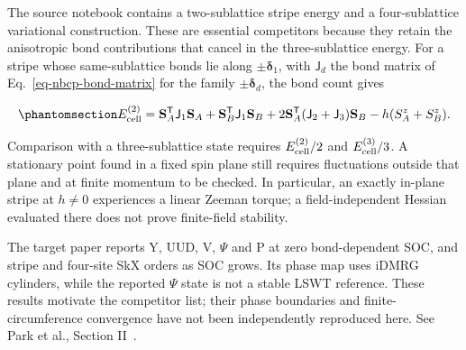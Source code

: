 The source notebook contains a two-sublattice stripe energy and a
four-sublattice variational construction. These are essential
competitors because they retain the anisotropic bond contributions that
cancel in the three-sublattice energy. For a stripe whose
same-sublattice bonds lie along \(\pm\boldsymbol\delta_1\), with
\(\mathsf J_d\) the bond matrix of Eq.~\eqref{eq-nbcp-bond-matrix} for the
family \(\pm\boldsymbol\delta_d\), the bond count gives

\begin{equation}\phantomsection\label{eq-nbcp-stripe-energy}{
E^{(2)}_{\rm cell}=\mathbf S_A^{\mathsf T}\mathsf J_1\mathbf S_A
+\mathbf S_B^{\mathsf T}\mathsf J_1\mathbf S_B
+2\mathbf S_A^{\mathsf T}(\mathsf J_2+\mathsf J_3)\mathbf S_B
-h(S_A^z+S_B^z).
}\end{equation}

Comparison with a three-sublattice state requires
\(E^{(2)}_{\rm cell}/2\) and \(E^{(3)}_{\rm cell}/3\). A stationary
point found in a fixed spin plane still requires fluctuations outside
that plane and at finite momentum to be checked. In particular, an
exactly in-plane stripe at \(h\ne0\) experiences a linear Zeeman torque;
a field-independent Hessian evaluated there does not prove finite-field
stability.

The target paper reports Y, UUD, V, \(\Psi\) and P at zero
bond-dependent SOC, and stripe and four-site SkX orders as SOC grows.
Its phase map uses iDMRG cylinders, while the reported \(\Psi\) state is
not a stable LSWT reference. These results motivate the competitor list;
their phase boundaries and finite-circumference convergence have not
been independently reproduced here. See
Park et al., Section II~\cite{park2026}.
